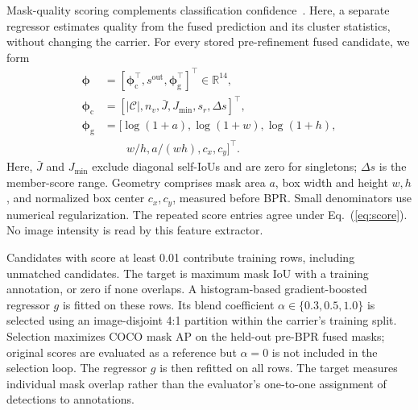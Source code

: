 Mask-quality scoring complements classification confidence~\cite{msrcnn2019}. Here, a separate regressor estimates quality from the fused prediction and its cluster statistics, without changing the carrier. For every stored pre-refinement fused candidate, we form
\begin{equation}\label{eq:rrfeat}
\begin{split}
\boldsymbol{\phi}&=[\boldsymbol{\phi}_{\mathrm{c}}^{\top},s^{\mathrm{out}},
\boldsymbol{\phi}_{\mathrm{g}}^{\top}]^{\top}\in\mathbb{R}^{14},\\
\boldsymbol{\phi}_{\mathrm{c}}&=[|\mathcal{C}|,n_v,\bar{J},J_{\min},s_r,\Delta s]^{\top},\\
\boldsymbol{\phi}_{\mathrm{g}}&=[\log(1+a),\log(1+w),\log(1+h),\\
&\qquad w/h,a/(wh),c_x,c_y]^{\top}.
\end{split}
\end{equation}
Here, $\bar{J}$ and $J_{\min}$ exclude diagonal self-IoUs and are zero for singletons; $\Delta s$ is the member-score range. Geometry comprises mask area $a$, box width and height $w,h$, and normalized box center $c_x,c_y$, measured before BPR. Small denominators use numerical regularization. The repeated score entries agree under Eq.~(\ref{eq:score}). No image intensity is read by this feature extractor.

Candidates with score at least 0.01 contribute training rows, including unmatched candidates. The target is maximum mask IoU with a training annotation, or zero if none overlaps. A histogram-based gradient-boosted regressor $g$ is fitted on these rows. Its blend coefficient $\alpha\in\{0.3,0.5,1.0\}$ is selected using an image-disjoint 4:1 partition within the carrier's training split. Selection maximizes COCO mask AP on the held-out pre-BPR fused masks; original scores are evaluated as a reference but $\alpha=0$ is not included in the selection loop. The regressor $g$ is then refitted on all rows. The target measures individual mask overlap rather than the evaluator's one-to-one assignment of detections to annotations.

